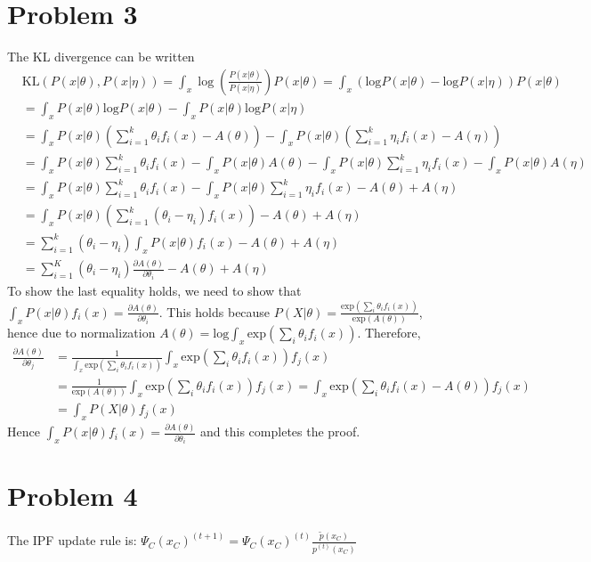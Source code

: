 \documentclass[12pt]{article}
\begin{document}
\section*{Problem 3}
\label{sec:prob3}
The KL divergence can be written 
\begin{equation}
    \begin{split}
        &\text{KL}(P(x|\theta),P(x|\eta)) = \int_x \log\left(\frac{P(x|\theta)}{P(x|\eta)}\right)P(x|\theta) 
            = \int_x \left( \text{log}P(x|\theta) - \text{log}P(x|\eta) \right) P(x|\theta) \\
        & = \int_x P(x|\theta) \text{log}P(x|\theta) - \int_x P(x|\theta) \text{log}P(x|\eta) \\
        & = \int_x P(x|\theta) \left( \sum_{i=1}^k \theta_i f_i(x) - A(\theta)  \right) -   
                \int_x P(x|\theta) \left( \sum_{i=1}^k \eta_i f_i(x) - A(\eta)  \right) \\
        & = \int_x P(x|\theta) \sum_{i=1}^k \theta_i f_i(x) - \int_x P(x|\theta) A(\theta)  -   
                \int_x P(x|\theta) \sum_{i=1}^k \eta_i f_i(x) - \int_x P(x|\theta) A(\eta) \\
        & = \int_x P(x|\theta) \sum_{i=1}^k \theta_i f_i(x) - \int_x P(x|\theta) \sum_{i=1}^k \eta_i f_i(x) 
            - A(\theta) + A(\eta)\\
        & = \int_x P(x|\theta) \left( \sum_{i=1}^k (\theta_i - \eta_i) f_i(x) \right)- A(\theta) + A(\eta)\\
        & = \sum_{i=1}^k (\theta_i - \eta_i) \int_x P(x|\theta) f_i(x) - A(\theta) + A(\eta)\\
        & = \sum_{i=1}^K (\theta_i - \eta_i) \frac{\partial A(\theta)}{\partial \theta_i} - A(\theta) + A(\eta)
    \end{split}
\end{equation}
To show the last equality holds, we need to show that $\int_x P(x|\theta) f_i(x) = \frac{\partial A(\theta)}{\partial \theta_i}$. This holds because $P(X|\theta) = \frac{\text{exp}(\sum_i \theta_i f_i(x))}{\text{exp}(A(\theta))}$, hence due to normalization $A(\theta) = \text{log}\int_x \text{exp}(\sum_i \theta_i f_i(x))$.
Therefore,
\begin{equation}
    \begin{split}
        \frac{\partial A(\theta)}{\partial \theta_j}
            &= \frac{1}{\int_x \text{exp}(\sum_i \theta_i f_i(x))}   \int_x \text{exp}(\sum_i \theta_i f_i(x)) f_j(x) \\
            &= \frac{1}{\text{exp}(A(\theta))} \int_x \text{exp}(\sum_i \theta_i f_i(x)) f_j(x) 
                = \int_x \text{exp}(\sum_i \theta_i f_i(x) - A(\theta)) f_j(x) \\
            &= \int_x P(X|\theta)f_j(x)
    \end{split}
\end{equation}
Hence $\int_x P(x|\theta) f_i(x) = \frac{\partial A(\theta)}{\partial \theta_i}$ and this completes the proof.


\section*{Problem 4}
\label{sec:prob4}

The IPF update rule is: $\Psi_C(x_C)^{(t+1)} = \Psi_C(x_C)^{(t)} \frac{\tilde{p}(x_C)}{p^{(t)}(x_C)}$
\end{document}

